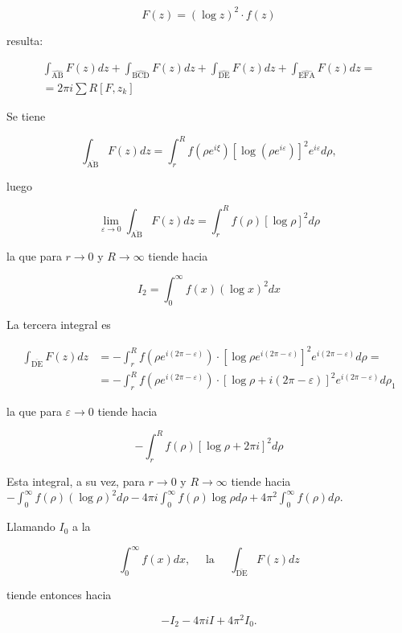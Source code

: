 \documentclass[10pt]{article}
\theoremstyle{plain}
\theoremstyle{definition}
\theoremstyle{remark}
\begin{document}
$$
F(z)=(\log z)^{2} \cdot f(z)
$$

resulta:


\begin{gather*}
\int_{\widehat{\mathrm{AB}}} F(z) d z+\int_{\widehat{\mathrm{BCD}}} F(z) d z+\int_{\widehat{\mathrm{DE}}} F(z) d z+\int_{\widehat{\mathrm{EFA}}} F(z) d z= \\
=2 \pi i \sum R\left[F, z_{k}\right] \tag{27.5}
\end{gather*}


Se tiene

$$
\int_{\overline{\mathrm{AB}}} F(z) d z=\int_{r}^{R} f\left(\rho e^{i \xi}\right)\left[\log \left(\rho e^{i \varepsilon}\right)\right]^{2} e^{i \varepsilon} d \rho,
$$

luego

$$
\lim _{\varepsilon \rightarrow 0} \int_{\overline{\mathrm{AB}}} F(z) d z=\int_{r}^{R} f(\rho)[\log \rho]^{2} d \rho
$$

la que para $r \rightarrow 0$ y $R \rightarrow \infty$ tiende hacia

$$
I_{2}=\int_{0}^{\infty} f(x)(\log x)^{2} d x
$$

La tercera integral es

$$
\begin{aligned}
\int_{\overline{\mathrm{DE}}} F(z) d z & =-\int_{r}^{R} f\left(\rho e^{i(2 \pi-\varepsilon)}\right) \cdot\left[\log \rho e^{i(2 \pi-\varepsilon)}\right]^{2} e^{i(2 \pi-\varepsilon)} d \rho= \\
& =-\int_{r}^{R} f\left(\rho e^{i(2 \pi-\varepsilon)}\right) \cdot[\log \rho+i(2 \pi-\varepsilon)]^{2} e^{i(2 \pi-\varepsilon)} d \rho_{1}
\end{aligned}
$$

la que para $\varepsilon \rightarrow 0$ tiende hacia

$$
-\int_{r}^{R} f(\rho)[\log \rho+2 \pi i]^{2} d \rho
$$

Esta integral, a su vez, para $r \rightarrow 0$ y $R \rightarrow \infty$ tiende hacia\\
$-\int_{0}^{\infty} f(\rho)(\log \rho)^{2} d \rho-4 \pi i \int_{0}^{\infty} f(\rho) \log \rho d \rho+4 \pi^{2} \int_{0}^{\infty} f(\rho) d \rho$.

Llamando $I_{0}$ a la

$$
\int_{0}^{\infty} f(x) d x, \quad \text { la } \quad \int_{\overline{\mathrm{DE}}} F(z) d z
$$

tiende entonces hacia

$$
-I_{2}-4 \pi i I+4 \pi^{2} I_{0} .
$$
\end{document}
